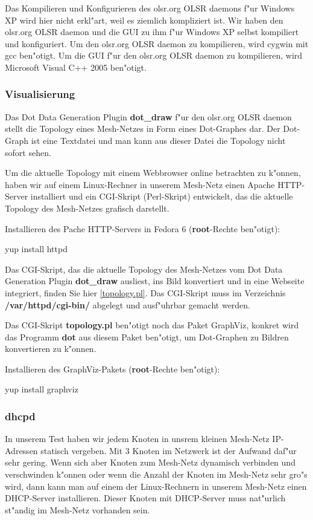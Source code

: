 Das Kompilieren und Konfigurieren des olsr.org OLSR daemons f"ur Windows XP
wird hier nicht erkl"art, weil es ziemlich kompliziert ist. Wir haben
den olsr.org OLSR daemon und die GUI zu ihm f"ur Windows XP selbst kompiliert
und konfiguriert. Um den olsr.org OLSR daemon zu kompilieren, wird cygwin
mit gcc ben"otigt. Um die GUI f"ur den olsr.org OLSR daemon zu kompilieren,
wird Microsoft Visual C++ 2005 ben"otigt.

\subsubsection{Visualisierung}

Das Dot Data Generation Plugin \textbf{dot\_draw} f"ur den olsr.org OLSR
daemon stellt die Topology eines Mesh-Netzes in Form eines Dot-Graphes dar.
Der Dot-Graph ist eine Textdatei und man kann aus dieser Datei die Topology
nicht sofort sehen.

Um die aktuelle Topology mit einem Webbrowser online betrachten zu k"onnen,
haben wir auf einem Linux-Rechner in unserem Mesh-Netz einen Apache
HTTP-Server installiert und ein CGI-Skript (Perl-Skript) entwickelt,
das die aktuelle Topology des Mesh-Netzes grafisch darstellt.

Installieren des Pache HTTP-Servers in Fedora 6
(\textbf{root}-Rechte ben"otigt):
\begin{shelllst}
yup install httpd
\end{shelllst}

Das CGI-Skript, das die aktuelle Topology des Mesh-Netzes vom
Dot Data Generation Plugin \textbf{dot\_draw} ausliest, ins Bild konvertiert
und in eine Webseite integriert, finden Sie hier \ref{topology.pl}.
Das CGI-Skript muss im Verzeichnis \textbf{/var/httpd/cgi-bin/} abgelegt
und ausf"uhrbar gemacht werden.

Das CGI-Skript \textbf{topology.pl} ben"otigt noch das Paket GraphViz,
konkret wird das Programm \textbf{dot} aus diesem Paket ben"otigt,
um Dot-Graphen zu Bildren konvertieren zu k"onnen.

Installieren des GraphViz-Pakets (\textbf{root}-Rechte ben"otigt):
\begin{shelllst}
yup install graphviz
\end{shelllst}

\subsubsection{dhcpd}

In unserem Test haben wir jedem Knoten in unsrem kleinen Mesh-Netz
IP-Adressen statisch vergeben. Mit 3 Knoten im Netzwerk ist der Aufwand daf"ur
sehr gering. Wenn sich aber Knoten zum Mesh-Netz dynamisch verbinden
und verschwinden k"onnen oder wenn die Anzahl der Knoten im Mesh-Netz
sehr gro"s wird, dann kann man auf einem der Linux-Rechnern in unserem
Mesh-Netz einen DHCP-Server installieren. Dieser Knoten
mit DHCP-Server muss nat"urlich st"andig im Mesh-Netz vorhanden sein.


